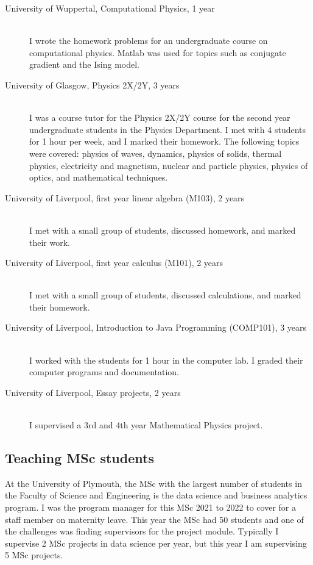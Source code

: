 \documentclass[12pt]{article}
\begin{document}
\begin{description}
  \item[University of Wuppertal, Computational Physics, 1 year] \hfill \\
I wrote
the homework problems for an 
undergraduate course on computational
physics. Matlab was used for topics such as conjugate gradient
and the Ising model.

  \item[University of Glasgow, Physics 2X/2Y, 3 years] \hfill \\
I was a course tutor for the Physics 2X/2Y course
for the second year undergraduate students
in the Physics Department. I met with 4 students for 1 hour per week,
and I marked their homework.
The following topics were covered:
physics of waves, dynamics, physics of solids, thermal physics,
electricity and magnetism, nuclear and particle physics, physics of
optics, and mathematical techniques.

\item[University of Liverpool, first year linear algebra
 (M103), 2 years] \hfill \\
I met with a small group of students, discussed homework,
and marked their work.

\item[University of Liverpool, first year calculus (M101), 2 years] \hfill \\
I met with a small group of students, discussed calculations,
and marked their homework.



\item[University of Liverpool, Introduction to Java Programming
 (COMP101), 3 years] \hfill \\
I worked with the students for 1 hour in the computer lab.
I graded their computer programs and documentation.



\item[University of Liverpool, Essay projects, 2 years] \hfill \\
I supervised a 3rd and 4th year Mathematical Physics project.

\end{description}

\subsection{Teaching MSc students}

At the University of Plymouth, the MSc with the largest
number of students in the Faculty of Science and Engineering
is the data science and business analytics program. I was the 
program manager for this MSc 2021 to 2022 to cover for a staff member
on maternity leave. This year the MSc had 50 students and one
of the challenges was finding supervisors for the project module.
Typically I supervise 2 MSc projects in data science per year, but this year 
I am supervising 5 MSc projects.
\end{document}
